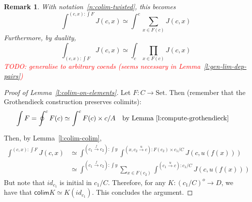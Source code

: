 \documentclass{article}
\newcommand{\Set}{\text{Set}}
\newcommand{\colim}{\mathsf{colim}}
\newtheorem{remark}[theorem]{Remark}
\begin{document}
\begin{remark}
  With notation~\ref{n:colim-twisted}, this becomes
  \[
    \int^{(c,x): \int F}  J(c,x)\simeq
    \int^{c}
    \sum_{x\in F(c)}
    J(c, x)
  \] 
  Furthermore, by duality,
  \[
    \int_{(c,x): \int F}  J(c,x)\simeq
    \int_{c}
    \prod_{x\in F(c)}
    J(c, x)
  \] 
  \textcolor{red}{TODO: generalise to arbitrary coends (seems necessary in Lemma~\ref{l:gen-lim-dep-pairs})}
\end{remark}
\begin{proof}[Proof of Lemma~\ref{l:colim-on-elements}]
  Let $F : C \rightarrow \Set$. Then (remember that the Grothendieck
  construction preserves colimits):
  \begin{align*}
    \int F = \oint^c F(c) &
                            \simeq
                             \int^c F(c)\times c/A
                            \text{\quad by Lemma~\ref{l:compute-grothendieck}}
                            \end{align*}

  Then, by Lemma~\ref{l:colim-colim},
  \begin{align*}
    \int^{(c,x): \int F}  J(c,x)
    & \simeq
    \int^{(c_1\xrightarrow{f}{} c_2):  \int y}
\int^{(x,c_2 \xrightarrow{u}{} c):F(c_2) \times  c_1/C}
    J(c, u(f(x)))
    \\
    &
      \simeq
      \int^{(c_1\xrightarrow{f}{} c_2):  \int y}
      \sum_{x\in F(c_2)}
      \int^{(c_1 \xrightarrow{u}{} c):   c_1/C}
      J(c, u(f(x)))
  \end{align*}
  But note that $id_{c_1}$ is initial in $c_1/C$. Therefore, for any $K:(c_1/C)^o\rightarrow
  D$, we have that $\colim K\simeq K(id_{c_1})$. This concludes the
  argument.
\end{proof}
\end{document}
